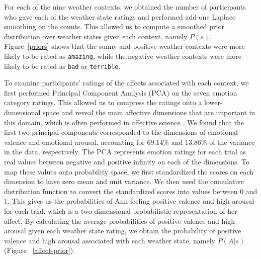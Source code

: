 \documentclass[10pt,letterpaper]{article}
\begin{document}
For each of the nine weather contexts, we obtained the number of participants who gave each of the weather state ratings and performed add-one Laplace smoothing on the counts. This allowed us to compute a smoothed prior distribution over weather states given each context, namely $P(s)$. Figure~\ref{priors} shows that the sunny and positive weather contexts were more likely to be rated as \texttt{amazing}, while the negative weather contexts were more likely to be rated as \texttt{bad} or \texttt{terrible}.  %

To examine participants' ratings of the affects associated with each context, we first performed Principal Component Analysis (PCA) on the seven emotion category ratings. This allowed us to compress the ratings onto a lower-dimensional space and reveal the main affective dimensions that are important in this domain, which is often performed in affective science \cite{russell1980circumplex}. We found that the first two principal components corresponded to the dimensions of emotional valence and emotional arousal, accounting for $69.14\%$ and $13.86\%$ of the variance in the data, respectively.
The PCA represents emotion ratings for each trial as real values between negative and positive infinity on each of the dimensions. To map these values onto probability space, we first standardized the scores on each dimension to have zero mean and unit variance. We then used the cumulative distribution function to convert the standardized scores into values between $0$ and $1$. 
This gives us the probabilities of Ann feeling positive valence and high arousal for each trial, which is a two-dimensional probabilistic representation of her affect.
By calculating the average probabilities of positive valence and high arousal given each weather state rating, we obtain the probability of positive valence and high arousal associated with each weather state, namely $P(A | s)$ (Figure ~\ref{affect-prior}).
\end{document}
